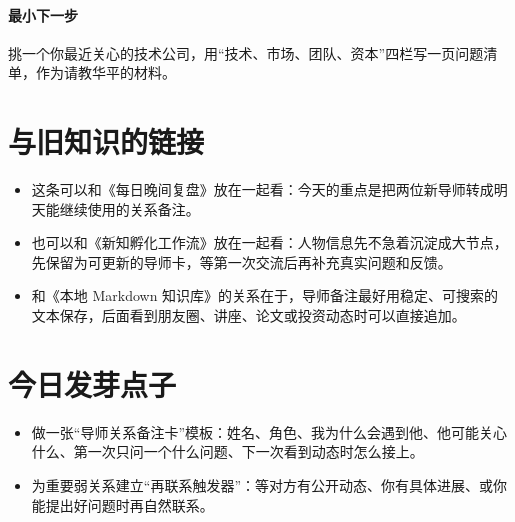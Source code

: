 \documentclass[UTF8,zihao=-4]{ctexart}
\begin{document}
\paragraph{最小下一步} 挑一个你最近关心的技术公司，用“技术、市场、团队、资本”四栏写一页问题清单，作为请教华平的材料。
\section*{与旧知识的链接}
\begin{itemize}[leftmargin=2em]
\item 这条可以和《每日晚间复盘》放在一起看：今天的重点是把两位新导师转成明天能继续使用的关系备注。
\item 也可以和《新知孵化工作流》放在一起看：人物信息先不急着沉淀成大节点，先保留为可更新的导师卡，等第一次交流后再补充真实问题和反馈。
\item 和《本地 Markdown 知识库》的关系在于，导师备注最好用稳定、可搜索的文本保存，后面看到朋友圈、讲座、论文或投资动态时可以直接追加。
\end{itemize}
\section*{今日发芽点子}
\begin{itemize}[leftmargin=2em]
\item 做一张“导师关系备注卡”模板：姓名、角色、我为什么会遇到他、他可能关心什么、第一次只问一个什么问题、下一次看到动态时怎么接上。
\item 为重要弱关系建立“再联系触发器”：等对方有公开动态、你有具体进展、或你能提出好问题时再自然联系。
\end{itemize}
\end{document}
